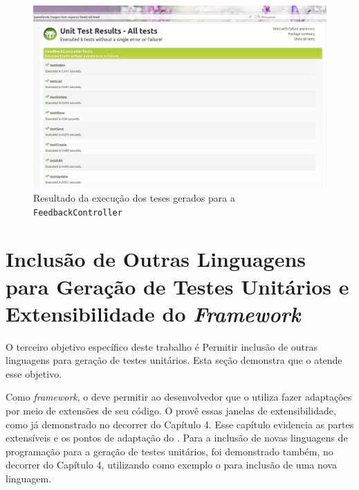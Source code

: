 \begin{figure}[h]
  \centering
    \includegraphics[width=\textwidth]{figuras/result-test-controller-feedback.png}
    \caption{Resultado da execução dos teses gerados para a \lstinline|FeedbackController|}
    \label{result-test-controller-feedback}
\end{figure}
\FloatBarrier

\section{Inclusão de Outras Linguagens para Geração de Testes Unitários e Extensibilidade do \textit{Framework}}
O terceiro objetivo específico deste trabalho é \textsf{Permitir inclusão de
outras linguagens para geração de testes unitários}. Esta seção demonstra que
o \scarefault atende esse objetivo.

Como \textit{framework}, o \scarefault deve permitir ao desenvolvedor que o utiliza
fazer adaptações por meio de extensões de seu código. O \scarefault provê
essas janelas de extensibilidade, como já demonstrado no decorrer do
Capítulo 4. Esse capítulo evidencia as partes extensíveis e os pontos de
adaptação do \framework. Para a inclusão de novas linguagens de programação
para a geração de testes unitários, foi demonstrado também, no decorrer do
Capítulo 4, utilizando como exemplo o \grails para inclusão de uma nova linguagem.

